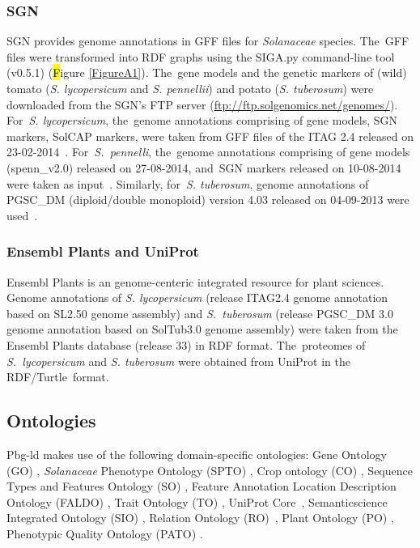 \documentclass[applsci,article,accept,moreauthors,pdftex]{Definitions/mdpi}
\begin{document}
{\subsubsection{SGN }
SGN provides genome annotations in GFF files for \textit{Solanaceae} %
species. The~GFF files were transformed into RDF graphs using the SIGA.py command-line tool (v0.5.1) \cite{Kuzniar2017} (\hl Figure \ref{FigureA1}). %
 The~gene models and the genetic markers of (wild) tomato (\textit{S. lycopersicum} and \textit{S. pennellii}) and potato (\textit{S. tuberosum}) were downloaded from the SGN’s FTP server (\url{ftp://ftp.solgenomics.net/genomes/}). For~\textit{S. lycopersicum}, the~genome annotations comprising of gene models, SGN markers, SolCAP markers, were taken from GFF files of the ITAG 2.4 released on 23-02-2014~\cite{LyocITAG2.4}. For~\textit{S.~pennelli}, the~genome annotations comprising of gene models (spenn{\_}v2.0) released on 27-08-2014, and~SGN markers released on 10-08-2014 were taken as input~\cite{PennITAG2.4}. Similarly, for~\textit{S. tuberosum}, genome annotations of PGSC{\_}DM (diploid/double monoploid) version 4.03 released on 04-09-2013 were used~\cite{PGSCDM}.

\subsubsection{Ensembl Plants and UniProt}
Ensembl Plants is an genome-centeric integrated resource for plant sciences. Genome annotations of \textit{S. lycopersicum} (release ITAG2.4 genome annotation based on SL2.50 genome assembly) \cite{EnsemblPlantSolanumlycopersicum} and \textit{S.~tuberosum} (release PGSC{\_}DM 3.0 genome annotation  based on SolTub3.0  genome assembly) were taken from the Ensembl Plants database (release 33) \cite{EnsemblPlantSolanumtuberosum} in RDF format. The~proteomes of \textit{S.~lycopersicum} \cite{UniprotSL} and \textit{S. tuberosum} \cite{UniprotST} were obtained from UniProt in the RDF/Turtle~format. 

\subsection{Ontologies}
Pbg-ld makes use of the following domain-specific ontologies: Gene Ontology (GO) \cite{GOontology}, \textit{Solanaceae} %
Phenotype Ontology (SPTO) \cite{SPTO}, Crop ontology (CO) \cite{CO}, Sequence Types and Features Ontology (SO) \cite{Eilbeck2005}, Feature Annotation Location Description Ontology (FALDO) \cite{FALDO}, Trait Ontology (TO) \cite{TO}, UniProt Core~\cite{UniprotRDFcore}, Semanticscience Integrated Ontology (SIO) \cite{SIO}, Relation Ontology (RO)~\cite{RO}, Plant Ontology (PO) \cite{doi:10.1093/pcp/pcs163}, Phenotypic Quality Ontology (PATO) \cite{Walls2012}.
\\\\


}
\end{document}
